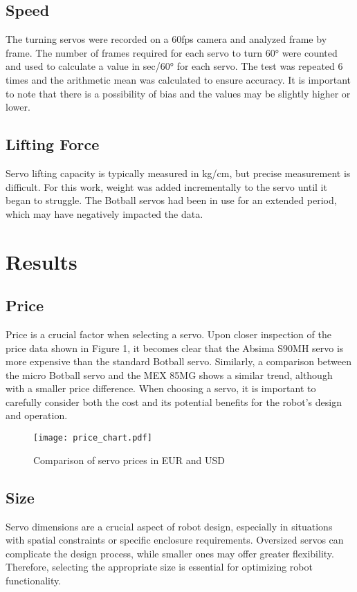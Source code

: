 \documentclass[conference]{IEEEtran}
\begin{document}
    \subsection{Speed}
        The turning servos were recorded on a 60fps camera and analyzed frame by frame. The number of frames required for each servo to turn 60° were counted and used to calculate a value in sec/60° for each servo. The test was repeated 6 times and the arithmetic mean was calculated to ensure accuracy. It is important to note that there is a possibility of bias and the values may be slightly higher or lower.

    \subsection{Lifting Force}
        Servo lifting capacity is typically measured in kg/cm, but precise measurement is difficult. For this work, weight was added incrementally to the servo until it began to struggle. The Botball servos had been in use for an extended period, which may have negatively impacted the data.
    
\section{Results}
    \subsection{Price}
        Price is a crucial factor when selecting a servo. Upon closer inspection of the price data shown in Figure 1, it becomes clear that the Absima S90MH servo is more expensive than the standard Botball servo. Similarly, a comparison between the micro Botball servo and the MEX 85MG shows a similar trend, although with a smaller price difference. When choosing a servo, it is important to carefully consider both the cost and its potential benefits for the robot's design and operation.

        \begin{figure}[htbp]
            \centering
            \texttt{[image: price\_chart.pdf]}
            \caption{Comparison of servo prices in EUR and USD}
        \end{figure}

    \subsection{Size}
        Servo dimensions are a crucial aspect of robot design, especially in situations with spatial constraints or specific enclosure requirements. Oversized servos can complicate the design process, while smaller ones may offer greater flexibility. Therefore, selecting the appropriate size is essential for optimizing robot functionality.
        
\end{document}
